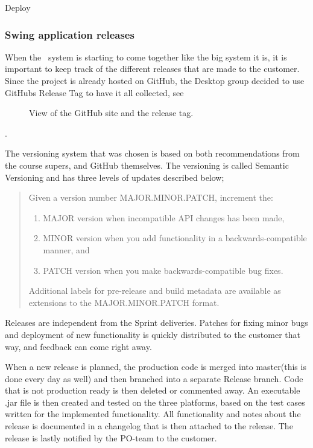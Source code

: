{\huge Deploy}
\subsubsection{Swing application releases}
When the \appName\ system is starting to come together like the big system it is, it is important to keep track of the different releases that are made to the customer. Since the project is already hosted on GitHub, the Desktop group decided to use GitHubs Release Tag to have it all collected, see 
\begin{figure}[htb]
	\caption{View of the GitHub site and the release tag.}
	\label{fig:des_gith-rel}
\end{figure}
\cite{des_rel-github}.

The versioning system that was chosen is based on both recommendations from the course supers, and GitHub themselves. The versioning is called Semantic Versioning\cite{des_semver} and has three levels of updates described below;

\begin{quotation}
	Given a version number MAJOR.MINOR.PATCH, increment the:
	\begin{enumerate}
		\item MAJOR version when incompatible API changes has been made,
    	\item MINOR version when you add functionality in a backwards-compatible manner, and
    	\item PATCH version when you make backwards-compatible bug fixes.
	\end{enumerate}
	Additional labels for pre-release and build metadata are available as extensions to the MAJOR.MINOR.PATCH format.
\end{quotation}
Releases are independent from the Sprint deliveries. Patches for fixing minor bugs and deployment of new functionality is quickly distributed to the customer that way, and feedback can come right away.

When a new release is planned, the production code is merged into master(this is done every day as well) and then branched into a separate Release branch. Code that is not production ready is then deleted or commented away. An executable .jar file is then created and tested on the three platforms, based on the test cases written for the implemented functionality. All functionality and notes about the release is documented in a changelog that is then attached to the release. The release is lastly notified by the PO-team to the customer.
